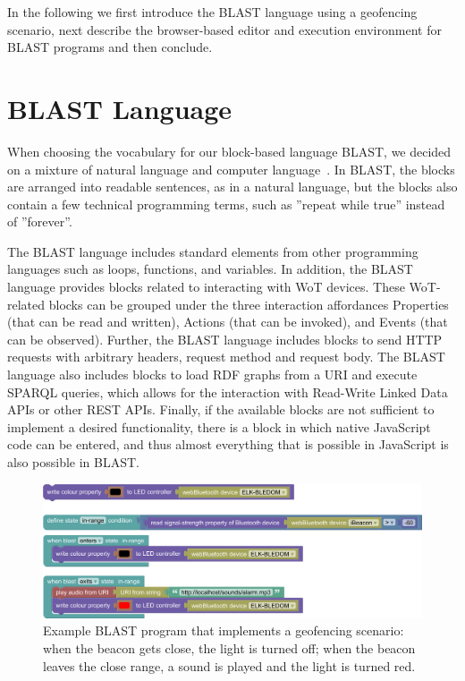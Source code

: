 \documentclass[runningheads]{llncs}
\begin{document}
In the following we first introduce the BLAST language using a geofencing scenario, next describe the browser-based editor and execution environment for BLAST programs and then conclude.

\section{BLAST Language}

When choosing the vocabulary for our block-based language BLAST, we decided on a mixture of natural language and computer language~\cite{8120404}.
In BLAST, the blocks are arranged into readable sentences, as in a natural language, but the blocks also contain a few technical programming terms, such as ''repeat while true'' instead of ''forever''.

The BLAST language includes standard elements from other programming languages such as loops, functions, and variables.
In addition, the BLAST language provides blocks related to interacting with WoT devices.
These WoT-related blocks can be grouped under the three interaction affordances Properties (that can be read and written), Actions (that can be invoked), and Events (that can be observed).
Further, the BLAST language includes blocks to send HTTP requests with arbitrary headers, request method and request body.
The BLAST language also includes blocks to load RDF graphs from a URI and execute SPARQL queries, which allows for the interaction with Read-Write Linked Data APIs or other REST APIs.
Finally, if the available blocks are not sufficient to implement a desired functionality, there is a block in which native JavaScript code can be entered, and thus almost everything that is possible in JavaScript is also possible in BLAST.

\begin{figure}
\includegraphics[width=\textwidth]{screenshot 3.png}%
\caption{Example BLAST program that implements a geofencing scenario: when the beacon gets close, the light is turned off; when the beacon leaves the close range, a sound is played and the light is turned red.} \label{fig1}
\end{figure}
\end{document}
